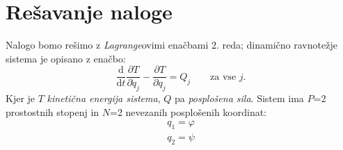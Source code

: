 \section{Rešavanje naloge}\label{sec:jedro}
%
Nalogo bomo rešimo z \emph{Lagrange}ovimi enačbami 2. reda;
dinamično ravnotežje sistema je opisano z enačbo:
\begin{equation}\label{eq:Lagrange2}
  \frac{\textrm{d}}{\textrm{d}t}
  \frac{\partial T}{\partial \dot{q}_j}-
  \frac{\partial T}{\partial q_j}
  =
  Q_j\qquad
  \textrm{za vse $j$.}
\end{equation}
Kjer je $T$ \emph{kinetična energija sistema}, $Q$ pa
\emph{posplošena sila}. Sistem ima $P$=2 prostostnih stopenj in
$N$=2 nevezanih posplošenih koordinat:
\begin{eqnarray}\label{eq:PospKoord}
  q_1=\varphi\\
  q_2=\psi
\end{eqnarray}

